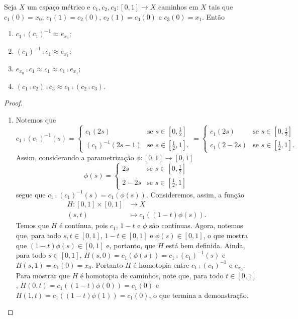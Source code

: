 \begin{proposition}
\label{prop:homo}
	Seja $X$ um espaço métrico e $c_1,c_2,c_3: [0,1] \to X$ caminhos em $X$ tais que $c_1(0)=x_0$, $c_1(1)=c_2(0)$, $c_2(1)=c_3(0)$ e $c_3(0)=x_1$. Então
	\begin{enumerate}
	\item $c_1 \comp (c_1)^{-1} \approx e_{x_0}$;
	\item $(c_1)^{-1} \comp c_1 \approx e_{x_1}$;
	\item $e_{x_0} \comp c_1 \approx c_1 \approx c_1 \comp e_{x_1}$;
	\item $(c_1 \comp c_2) \comp c_3 \approx c_1 \comp (c_2 \comp c_3)$.
	\end{enumerate}
\end{proposition}
\begin{proof}
	\begin{enumerate}
	\item Notemos que
	\begin{equation*}
	c_1 \comp (c_1)^{-1}(s)
		=
			\begin{cases}
				c_1(2s) &\text{se $s \in [0,\frac{1}{2}]$} \\
				(c_1)^{-1}(2s-1) &\text{se $s \in [\frac{1}{2},1]$}.
			\end{cases}
		=
			\begin{cases}
				c_1(2s) &\text{se $s \in [0,\frac{1}{2}]$} \\
				c_1(2-2s) &\text{se $s \in [\frac{1}{2},1]$}.
			\end{cases}
	\end{equation*}
	Assim, considerando a parametrização $\phi: [0,1] \to [0,1]$
	\begin{equation*}
	\phi(s)
		=
			\begin{cases}
				2s &\text{se $s \in [0,\frac{1}{2}]$} \\
				2-2s &\text{se $s \in [\frac{1}{2},1]$}
			\end{cases}
	\end{equation*}
segue que $c_1 \comp (c_1)^{-1}(s) = c_1(\phi(s))$.
Consideremos, assim, a função
	\begin{align*}
	H: [0,1] \times [0,1] &\to X \\
		(s,t) &\mapsto c_1((1-t)\phi(s)).
	\end{align*}
	Temos que $H$ é contínua, pois $c_1$, $1-t$ e $\phi$ são contínuas. Agora, notemos que, para todo $s,t \in [0,1]$, $1-t \in [0,1]$ e $\phi(s) \in [0,1]$, o que mostra que $(1-t)\phi(s) \in [0,1]$ e, portanto, que $H$ está bem definida. Ainda, para todo $s \in [0,1]$, $H(s,0)=c_1(\phi(s))=c_1 \comp (c_1)^{-1}(s)$ e $H(s,1)=c_1(0)=x_0$. Portanto $H$ é homotopia entre $c_1 \comp (c_1)^{-1}$ e $e_{x_0}$.	Para mostrar que $H$ é homotopia de caminhos, note que, para todo $t \in [0,1]$,	$H(0,t)=c_1((1-t)\phi(0))=c_1(0)$ e $H(1,t)=c_1((1-t)\phi(1))=c_1(0)$, o que termina a demonstração.
	

\end{enumerate}
\end{proof}
